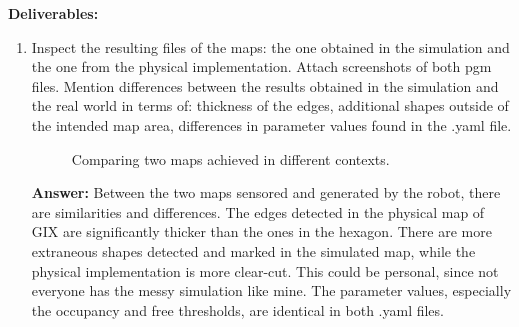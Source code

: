 \documentclass[12pt]{article}
\begin{document}
\textbf{Deliverables:}
\begin{enumerate}
    \item Inspect the resulting files of the maps: the one obtained in the simulation and the one from the physical implementation. Attach screenshots of both pgm files. Mention differences between the results obtained in the simulation and the real world in terms of: thickness of the edges, additional shapes outside of the intended map area, differences in parameter values found in the .yaml file.
    
    \begin{figure}
        \centering
        \hfill
        \caption{Comparing two maps achieved in different contexts.}
        \label{fig:map_pgm}
    \end{figure}

    \textbf{Answer: }Between the two maps sensored and generated by the robot, there are similarities and differences. The edges detected in the physical map of GIX are significantly thicker than the ones in the hexagon. There are more extraneous shapes detected and marked in the simulated map, while the physical implementation is more clear-cut. This could be personal, since not everyone has the messy simulation like mine. The parameter values, especially the occupancy and free thresholds, are identical in both .yaml files.
    

\end{enumerate}
\end{document}
